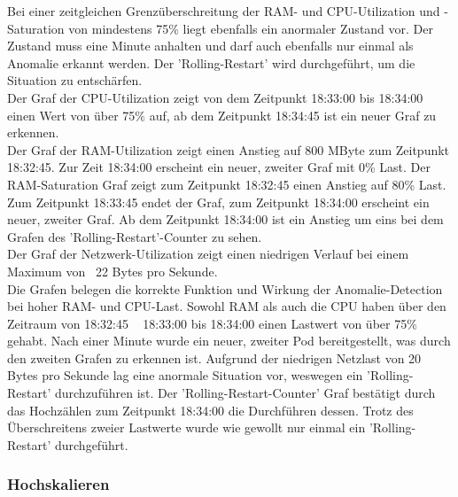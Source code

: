 \documentclass[a4paper,10pt]{scrartcl}
\begin{document}
\begin{description}
Bei einer zeitgleichen Grenzüberschreitung der RAM- und CPU-Utilization und -Saturation von mindestens 75\% liegt ebenfalls ein anormaler Zustand vor. Der Zustand muss eine Minute anhalten und darf auch ebenfalls nur einmal als Anomalie erkannt werden. Der 'Rolling-Restart' wird durchgeführt, um die Situation zu entschärfen.\\
Der Graf der CPU-Utilization zeigt von dem Zeitpunkt 18:33:00 bis 18:34:00 einen Wert von über 75\% auf, ab dem Zeitpunkt 18:34:45 ist ein neuer Graf zu erkennen.\\
Der Graf der RAM-Utilization zeigt einen Anstieg auf 800 MByte zum Zeitpunkt 18:32:45. Zur Zeit 18:34:00 erscheint ein neuer, zweiter Graf mit 0\% Last.
Der RAM-Saturation Graf zeigt zum Zeitpunkt 18:32:45 einen Anstieg auf 80\% Last. Zum Zeitpunkt 18:33:45 endet der Graf, zum Zeitpunkt 18:34:00 erscheint ein neuer, zweiter Graf.
Ab dem Zeitpunkt 18:34:00 ist ein Anstieg um eins bei dem Grafen des 'Rolling-Restart'-Counter zu sehen.\\
Der Graf der Netzwerk-Utilization zeigt einen niedrigen Verlauf bei einem Maximum von ~22 Bytes pro Sekunde.\\
Die Grafen belegen die korrekte Funktion und Wirkung der Anomalie-Detection bei hoher RAM- und CPU-Last. Sowohl RAM als auch die CPU haben über den Zeitraum von 18:32:45 ~ 18:33:00 bis 18:34:00 einen Lastwert von über 75\% gehabt. Nach einer Minute wurde ein neuer, zweiter Pod bereitgestellt, was durch den zweiten Grafen zu erkennen ist. Aufgrund der niedrigen Netzlast von 20 Bytes pro Sekunde lag eine anormale Situation vor, weswegen ein 'Rolling-Restart' durchzuführen ist. Der 'Rolling-Restart-Counter' Graf bestätigt durch das Hochzählen zum Zeitpunkt 18:34:00 die Durchführen dessen. Trotz des Überschreitens zweier Lastwerte wurde wie gewollt nur einmal ein 'Rolling-Restart' durchgeführt.

\end{description}

\pagebreak

\subsubsection{Hochskalieren}
\end{document}
